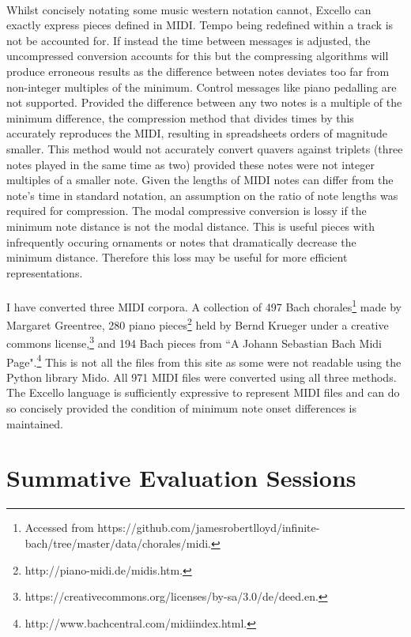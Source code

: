 \paragraph{} Whilst concisely notating some music western notation cannot, Excello can exactly express pieces defined in MIDI. Tempo being redefined within a track is not be accounted for. If instead the time between messages is adjusted, the uncompressed conversion accounts for this but the compressing algorithms will produce erroneous results as the difference between notes deviates too far from non-integer multiples of the minimum. Control messages like piano pedalling are not supported. Provided the difference between any two notes is a multiple of the minimum difference, the compression method that divides times by this accurately reproduces the MIDI, resulting in spreadsheets orders of magnitude smaller. This method would not accurately convert quavers against triplets (three notes played in the same time as two) provided these notes were not integer multiples of a smaller note. Given the lengths of MIDI notes can differ from the note's time in standard notation, an assumption on the ratio of note lengths was required for compression. The modal compressive conversion is lossy if the minimum note distance is not the modal distance. This is useful pieces with infrequently occuring ornaments or notes that dramatically decrease the minimum distance. Therefore this loss may be useful for more efficient representations.

\paragraph{} I have converted three MIDI corpora. A collection of 497 Bach chorales\footnote{Accessed from https://github.com/jamesrobertlloyd/infinite-bach/tree/master/data/chorales/midi.} made by Margaret Greentree, 280 piano pieces\footnote{http://piano-midi.de/midis.htm.} held by Bernd Krueger under a creative commons license,\footnote{https://creativecommons.org/licenses/by-sa/3.0/de/deed.en.} and 194 Bach pieces from ``A Johann Sebastian Bach Midi Page".\footnote{http://www.bachcentral.com/midiindex.html.} This is not all the files from this site as some were not readable using the Python library Mido. All 971 MIDI files were converted using all three methods. The Excello language is sufficiently expressive to represent MIDI files and can do so concisely provided the condition of minimum note onset differences is maintained.

\section{Summative Evaluation Sessions}

